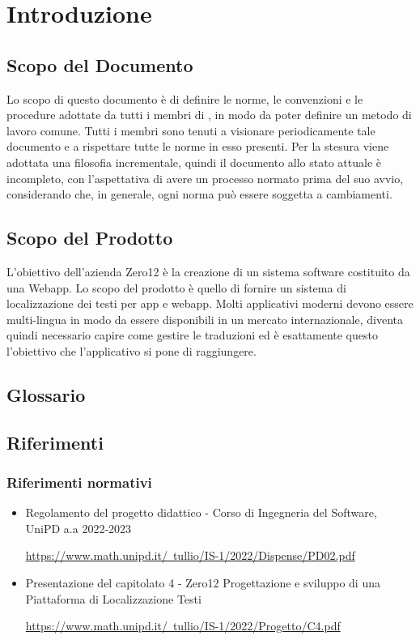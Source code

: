 \section{Introduzione}
\subsection{Scopo del Documento}
Lo scopo di questo documento è di definire le norme, le convenzioni e le procedure adottate da tutti i membri di \groupName{}, in modo da poter definire un metodo di lavoro comune. Tutti i membri sono tenuti a visionare periodicamente tale documento e a rispettare tutte le norme in esso presenti. Per la stesura viene adottata una filosofia incrementale, quindi il documento allo stato attuale è incompleto, con l'aspettativa di avere un processo normato prima del suo avvio, considerando che, in generale, ogni norma può essere soggetta a cambiamenti.

\subsection{Scopo del Prodotto}
L'obiettivo dell'azienda Zero12 è la creazione di un sistema software costituito da una Webapp. Lo scopo del prodotto è quello di fornire un sistema di localizzazione dei testi per app e webapp. Molti applicativi moderni devono essere multi-lingua in modo da essere disponibili in un mercato internazionale, diventa quindi necessario capire come gestire le traduzioni ed è esattamente questo l’obiettivo che l’applicativo si pone di raggiungere.

\subsection{Glossario}
\gloDesc{}

\subsection{Riferimenti}
\subsubsection{Riferimenti normativi}
\begin{itemize}
\item Regolamento del progetto didattico - Corso di Ingegneria del Software, UniPD a.a 2022-2023

\href{https://www.math.unipd.it/~tullio/IS-1/2022/Dispense/PD02.pdf}{https://www.math.unipd.it/~tullio/IS-1/2022/Dispense/PD02.pdf}

\item Presentazione del capitolato\glo{} 4 - Zero12 Progettazione e sviluppo di una Piattaforma di Localizzazione Testi 

\href{https://www.math.unipd.it/~tullio/IS-1/2022/Progetto/C4.pdf}{https://www.math.unipd.it/~tullio/IS-1/2022/Progetto/C4.pdf}
\end{itemize}

